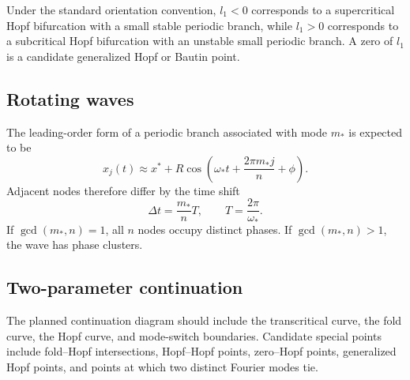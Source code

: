 \documentclass[11pt, reqno]{amsart}
\theoremstyle{definition}
\theoremstyle{remark}
\begin{document}
	Under the standard orientation convention, $l_1<0$ corresponds to a
	supercritical Hopf bifurcation with a small stable periodic branch, while
	$l_1>0$ corresponds to a subcritical Hopf bifurcation with an unstable small
	periodic branch.  A zero of $l_1$ is a candidate generalized Hopf or Bautin
	point.
	
	
	\subsection{Rotating waves}
	
	The leading-order form of a periodic branch associated with mode $m_*$ is
	expected to be
	\begin{equation}
		\label{eq:rotating-wave}
		x_j(t)
		\approx
		x^*
		+R\cos\left(
		\omega_*t+\frac{2\pi m_*j}{n}+\phi
		\right).
	\end{equation}
	Adjacent nodes therefore differ by the time shift
	\begin{equation}
		\label{eq:phase-shift}
		\Delta t
		=
		\frac{m_*}{n}T,
		\qquad
		T=\frac{2\pi}{\omega_*}.
	\end{equation}
	If $\gcd(m_*,n)=1$, all $n$ nodes occupy distinct phases.  If
	$\gcd(m_*,n)>1$, the wave has phase clusters.
	
	
	\subsection{Two-parameter continuation}
	
	The planned continuation diagram should include the transcritical curve, the
	fold curve, the Hopf curve, and mode-switch boundaries.  Candidate special
	points include fold--Hopf intersections, Hopf--Hopf points, zero--Hopf points,
	generalized Hopf points, and points at which two distinct Fourier modes tie.
	
	
\end{document}
